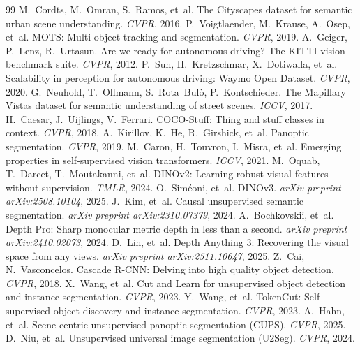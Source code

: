 \documentclass{article}
\begin{document}
\begin{thebibliography}{99}
 M.~Cordts, M.~Omran, S.~Ramos, et~al. The Cityscapes dataset for semantic urban scene understanding. \emph{CVPR}, 2016.
 P.~Voigtlaender, M.~Krause, A.~Osep, et~al. MOTS: Multi-object tracking and segmentation. \emph{CVPR}, 2019.
 A.~Geiger, P.~Lenz, R.~Urtasun. Are we ready for autonomous driving? The KITTI vision benchmark suite. \emph{CVPR}, 2012.
 P.~Sun, H.~Kretzschmar, X.~Dotiwalla, et~al. Scalability in perception for autonomous driving: Waymo Open Dataset. \emph{CVPR}, 2020.
 G.~Neuhold, T.~Ollmann, S.~Rota~Bul\`o, P.~Kontschieder. The Mapillary Vistas dataset for semantic understanding of street scenes. \emph{ICCV}, 2017.
 H.~Caesar, J.~Uijlings, V.~Ferrari. COCO-Stuff: Thing and stuff classes in context. \emph{CVPR}, 2018.
 A.~Kirillov, K.~He, R.~Girshick, et~al. Panoptic segmentation. \emph{CVPR}, 2019.
 M.~Caron, H.~Touvron, I.~Misra, et~al. Emerging properties in self-supervised vision transformers. \emph{ICCV}, 2021.
 M.~Oquab, T.~Darcet, T.~Moutakanni, et~al. DINOv2: Learning robust visual features without supervision. \emph{TMLR}, 2024.
 O.~Sim\'eoni, et~al. DINOv3. \emph{arXiv preprint arXiv:2508.10104}, 2025.
 J.~Kim, et~al. Causal unsupervised semantic segmentation. \emph{arXiv preprint arXiv:2310.07379}, 2024.
 A.~Bochkovskii, et~al. Depth Pro: Sharp monocular metric depth in less than a second. \emph{arXiv preprint arXiv:2410.02073}, 2024.
 D.~Lin, et~al. Depth Anything 3: Recovering the visual space from any views. \emph{arXiv preprint arXiv:2511.10647}, 2025.
 Z.~Cai, N.~Vasconcelos. Cascade R-CNN: Delving into high quality object detection. \emph{CVPR}, 2018.
 X.~Wang, et~al. Cut and Learn for unsupervised object detection and instance segmentation. \emph{CVPR}, 2023.
 Y.~Wang, et~al. TokenCut: Self-supervised object discovery and instance segmentation. \emph{CVPR}, 2023.
 A.~Hahn, et~al. Scene-centric unsupervised panoptic segmentation (CUPS). \emph{CVPR}, 2025.
 D.~Niu, et~al. Unsupervised universal image segmentation (U2Seg). \emph{CVPR}, 2024.

\end{thebibliography}
\end{document}
